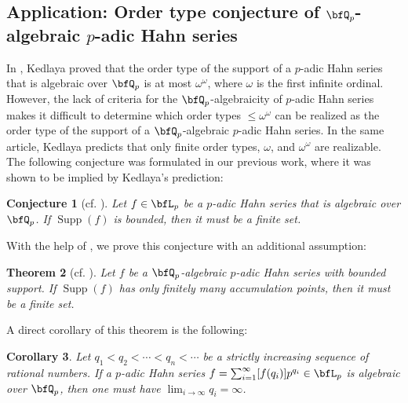 \documentclass[english,oneside]{smfart}
\newcommand{\opn}[1]{\operatorname{#1}}
\newtheorem{theorem}{Theorem}[section]
\newtheorem{conjecture}[theorem]{Conjecture}
\newtheorem{corollary}[theorem]{Corollary}
\begin{document}
\subsection{Application: Order type conjecture of $\bfQ_p$-algebraic $p$-adic Hahn series}
In \cite[Section 4]{kedlayaPowerSeriesPAdic2001}, Kedlaya proved that the order type of the support of a $p$-adic Hahn series that is algebraic over $\bfQ_p$ is at most $\omega^\omega$, where $\omega$ is the first infinite ordinal. However, the lack of criteria for the $\bfQ_p$-algebraicity of $p$-adic Hahn series makes it difficult to determine which order types $\leq \omega^\omega$ can be realized as the order type of the support of a $\bfQ_p$-algebraic $p$-adic Hahn series. In the same article, Kedlaya predicts that only finite order types, $\omega$, and $\omega^\omega$ are realizable. The following conjecture was formulated in our previous work, where it was shown to be implied by Kedlaya's prediction:
\begin{conjecture}[cf. {\cite[Conjecture 5.1]{wang2025padictranscendencesumk1inftyp1pk}}]\label{conj:47376}
    Let $f\in\bfL_p$ be a $p$-adic Hahn series that is algebraic over $\bfQ_p$. If $\opn{Supp}(f)$ is bounded, then it must be a finite set.
\end{conjecture}
With the help of , we prove this conjecture with an additional assumption:
\begin{theorem}[cf. ]\label{thm:16129}
    Let $f$ be a $\bfQ_p$-algebraic $p$-adic Hahn series with bounded support. If $\opn{Supp}(f)$ has only finitely many accumulation points, then it must be a finite set.
\end{theorem}

A direct corollary of this theorem is the following:
\begin{corollary}\label{coro:3344}
    Let $q_1<q_2<\cdots<q_n<\cdots$ be a strictly increasing sequence of rational numbers. If a $p$-adic Hahn series $f=\sum_{i=1}^\infty [f(q_i)]p^{q_i}\in\bfL_p$ is algebraic over $\bfQ_p$, then one must have $\lim_{i\to\infty}q_i=\infty$.
\end{corollary}
\end{document}

